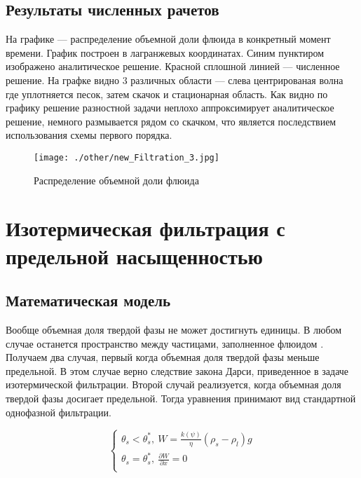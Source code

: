 \documentclass[12pt,a4paper]{article}
\newcommand{\pd}[2]{\frac{\partial #1}{\partial #2}}
\begin{document}
\subsection{Результаты численных рачетов}
На графике --- распределение объемной доли флюида в конкретный момент времени. График построен в лагранжевых координатах. Синим пунктиром изображено аналитическое решение. Красной сплошной линией --- численное решение. На графке видно 3 различных области --- слева центрированая волна где уплотняется песок, затем скачок и стационарная область. Как видно по графику решение разностной задачи неплохо аппроксимирует аналитическое решение, немного размывается рядом со скачком, что является последствием использования схемы первого порядка.
\begin{figure}[h!]
\begin{center}
\texttt{[image: ./other/new\_Filtration\_3.jpg]}
\caption{Распределение объемной доли флюида}
\end{center}
\end{figure}
\newpage
\section{Изотермическая фильтрация с предельной насыщенностью}
\subsection{Математическая модель}
Вообще объемная доля твердой фазы не может достигнуть единицы. В любом случае останется пространство между частицами, заполненное флюидом \cite{Dobr_phys02}. Получаем два случая, первый когда объемная доля твердой фазы меньше предельной. В этом случае верно следствие закона Дарси, приведенное в задаче изотермической фильтрации. Второй случай реализуется, когда объемная доля твердой фазы досигает предельной. Тогда уравнения принимают вид стандартной однофазной фильтрации.%

\begin{equation}
\begin{cases}
\theta_s < \theta_s^*,\  W = \frac{k(\psi)}{\eta} (\rho_s - \rho_l) g\\
\theta_s = \theta_s^*,\  \pd{W}{x} = 0\\
\end{cases}
\end{equation}
\end{document}
